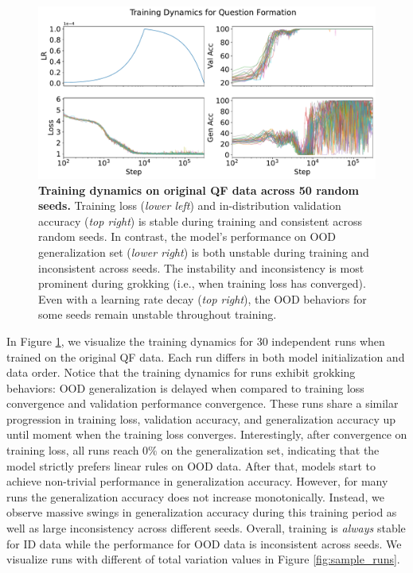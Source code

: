 \begin{figure}[t]
    \centering
    \includegraphics[width=.7\textwidth]{figures/warmup10k_lr1e-4_gradnorm1_trainig_dynamics.pdf}
    \caption{\textbf{Training dynamics on original QF data across 50 random seeds.} Training loss (\textit{lower left}) and in-distribution validation accuracy  (\textit{top right}) is stable during training and consistent across random seeds. In contrast, the model's performance on OOD generalization set (\textit{lower right}) is both unstable during training and inconsistent across seeds. The instability and inconsistency is most prominent during grokking (i.e., when training loss has converged). Even with a learning rate decay (\textit{top right}), the OOD behaviors for some seeds remain unstable throughout training.
    }
    \label{fig:grokking_inconsistency}
\end{figure}
In Figure \ref{fig:grokking_inconsistency}, we visualize the training dynamics for 30 independent runs when trained on the original QF data. Each run differs in both model initialization and data order. Notice that the training dynamics for runs exhibit grokking behaviors: OOD generalization is delayed when compared to training loss convergence and validation performance convergence. These runs share a similar progression in training loss, validation accuracy, and generalization accuracy up until moment when the training loss converges. 
Interestingly, after convergence on training loss, all runs reach $0\%$ on the generalization set, indicating that the model strictly prefers linear rules on OOD data. 
After that, models start to achieve non-trivial performance in generalization accuracy.
However, for many runs the generalization accuracy does not increase monotonically. Instead, we observe massive swings in generalization accuracy during this training period as well as large inconsistency across different seeds.
Overall, training is \textit{always} stable for ID data while the performance for OOD data is inconsistent across seeds. 
We visualize runs with different of total variation values in Figure \ref{fig:sample_runs}. 






